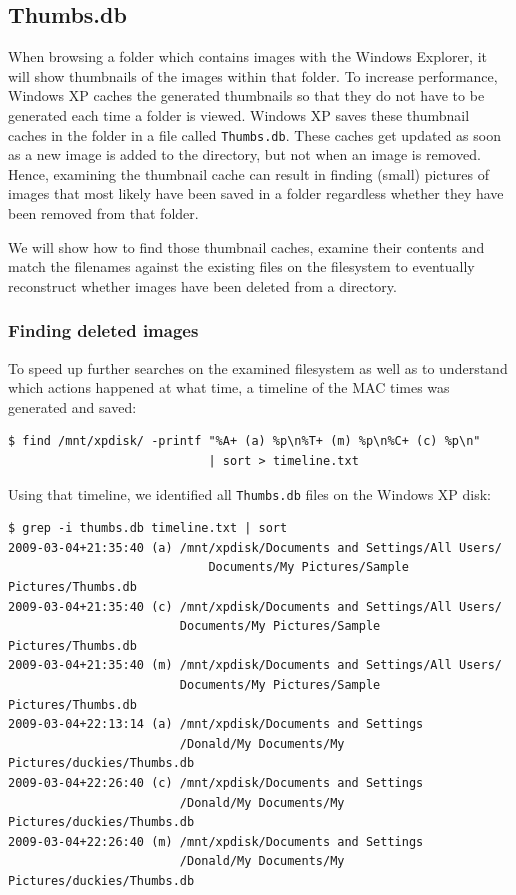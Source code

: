 \documentclass[a4paper,
    11pt,
    normalheadings,
    parindent,
    UKenglish,
    abstracton,
    ]{scrartcl}
\renewcommand{\comment}[1]{}
\begin{document}
\subsection{Thumbs.db}
When browsing a folder which contains images with the Windows Explorer, it will show thumbnails of the images within that folder.
To increase performance, Windows XP caches the generated thumbnails so that they do not have to be generated each time a folder is viewed.
Windows XP saves these thumbnail caches in the folder in a file called \texttt{Thumbs.db}.
These caches get updated as soon as a new image is added to the directory, but not when an image is removed.
Hence, examining the thumbnail cache can result in finding (small) pictures of images that most likely have been saved in a folder regardless whether they have been removed from that folder.
\comment{We will show how we do what?!}

We will show how to find those thumbnail caches, examine their contents and match the filenames against the existing files on the filesystem to eventually reconstruct whether images have been deleted from a directory.

\subsubsection{Finding deleted images}
To speed up further searches on the examined filesystem as well as to understand which actions happened at what time, a timeline of the MAC times was generated and saved:
\begin{verbatim}
$ find /mnt/xpdisk/ -printf "%A+ (a) %p\n%T+ (m) %p\n%C+ (c) %p\n"
                            | sort > timeline.txt
\end{verbatim}

Using that timeline, we identified all \texttt{Thumbs.db} files on the Windows XP disk:
\begin{verbatim}
$ grep -i thumbs.db timeline.txt | sort
2009-03-04+21:35:40 (a) /mnt/xpdisk/Documents and Settings/All Users/
                            Documents/My Pictures/Sample Pictures/Thumbs.db
2009-03-04+21:35:40 (c) /mnt/xpdisk/Documents and Settings/All Users/
                        Documents/My Pictures/Sample Pictures/Thumbs.db
2009-03-04+21:35:40 (m) /mnt/xpdisk/Documents and Settings/All Users/
                        Documents/My Pictures/Sample Pictures/Thumbs.db
2009-03-04+22:13:14 (a) /mnt/xpdisk/Documents and Settings
                        /Donald/My Documents/My Pictures/duckies/Thumbs.db
2009-03-04+22:26:40 (c) /mnt/xpdisk/Documents and Settings
                        /Donald/My Documents/My Pictures/duckies/Thumbs.db
2009-03-04+22:26:40 (m) /mnt/xpdisk/Documents and Settings
                        /Donald/My Documents/My Pictures/duckies/Thumbs.db
\end{verbatim}
\end{document}
